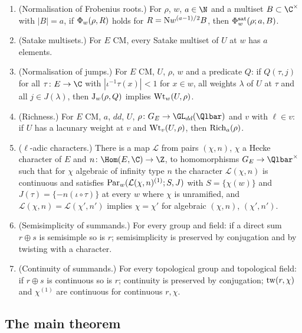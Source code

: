 \begin{definition}
\begin{enumerate}[label=\textup{(S\arabic*)},leftmargin=3.2em,nosep]
  $\stepsiiJ_w(\stepsiitw(\rho,\chi),Q')$ with $Q'(\tau,j)=Q(\tau,j-m(\tau))$; and
  $\stepsiiPhi_w(\rho,R)$ implies $\stepsiiPhi_w(\stepsiitw(\rho,\chi),c\cdot R)$.
\item[(S11)] (Normalisation of Frobenius roots.) For $\rho$, $w$, $a\in\N$ and a multiset
  $B\subset\C^\times$ with $|B|=a$, if $\stepsiiPhi_w(\rho,R)$ holds for
  $R=\mathrm{N}w^{(a-1)/2}B$, then $\Phi^{\mathrm{sat}}_w(\rho;a,B)$.
\item[(S12)] (Satake multisets.) For $E$ CM, every Satake multiset of $U$ at $w$ has $a$ elements.
\item[(S13)] (Normalisation of jumps.) For $E$ CM, $U$, $\rho$, $w$ and a predicate $Q$: if
  $Q(\tau,j)$ for all $\tau\colon E\to\C$ with $|\iota^{-1}\tau(x)|<1$ for $x\in w$, all weights
  $\lambda$ of $U$ at $\tau$ and all $j\in J(\lambda)$, then $\mathrm{J}_w(\rho,Q)$ implies
  $\mathrm{Wt}_w(U,\rho)$.
\item[(S14)] (Richness.) For $E$ CM, $a$, $dd$, $U$, $\rho\colon G_E\to\GL_{dd}(\Qlbar)$ and $v$ with
  $\ell\in v$: if $U$ has a lacunary weight at $v$ and $\mathrm{Wt}_v(U,\rho)$, then
  $\mathrm{Rich}_a(\rho)$.
\item[(S15)] ($\ell$-adic characters.) There is a map $\mathcal L$ from pairs $(\chi,n)$, $\chi$ a Hecke
  character of $E$ and $n\colon\Hom(E,\C)\to\Z$, to homomorphisms $G_E\to\Qlbar^\times$ such that for
  $\chi$ algebraic of infinity type $n$ the character $\mathcal L(\chi,n)$ is continuous and satisfies
  $\mathrm{Par}_w(\mathcal L(\chi,n)^{(1)};S,J)$ with $S=\{\chi(w)\}$ and $J(\tau)=\{-n(\iota\circ\tau)\}$
  at every $w$ where $\chi$ is unramified, and $\mathcal L(\chi,n)=\mathcal L(\chi',n')$ implies
  $\chi=\chi'$ for algebraic $(\chi,n)$, $(\chi',n')$.
\item[(S16)] (Semisimplicity of summands.) For every group and field: if a direct sum $r\oplus s$ is
  semisimple so is $r$; semisimplicity is preserved by conjugation and by twisting with a character.
\item[(S17)] (Continuity of summands.) For every topological group and topological field: if
  $r\oplus s$ is continuous so is $r$; continuity is preserved by conjugation; $\mathrm{tw}(r,\chi)$ and
  $\chi^{(1)}$ are continuous for continuous $r,\chi$.
\end{enumerate}
\end{definition}

\subsection{The main theorem}\label{sec:pf:steps2:assembly}

